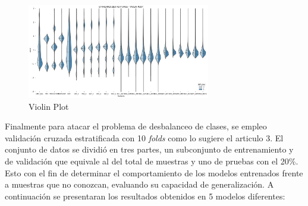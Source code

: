 \documentclass[conference]{IEEEtran}
\begin{document}
\begin{center}
    \begin{figure}[H]
        \hfill
            \includegraphics[width=8cm]{violin.png}\hspace*{\fill}
    \caption{Violin Plot}
    \label{fig:violinPlot}
    \end{figure}  
\end{center}
Finalmente para atacar el problema de desbalanceo de clases, se empleo validación cruzada estratificada con 10 \textit{folds} como lo sugiere el articulo 3. El conjunto de datos se dividió en tres partes, un subconjunto de entrenamiento y de validación que equivale al  del total de muestras y uno de pruebas con el 20\%. Esto con el fin de determinar el comportamiento de los modelos entrenados frente a muestras que no conozcan, evaluando su capacidad de generalización.
A continuación se presentaran los resultados obtenidos en 5 modelos diferentes:
\end{document}
